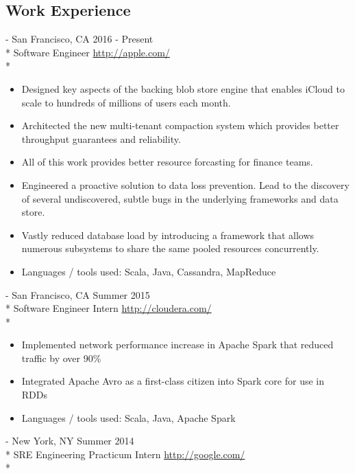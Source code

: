 \documentclass[a4paper,margin,line]{resume}
\newcommand{\rurl}[1]{\hfill {\footnotesize \url{#1}}}
\newcommand{\rdate}[1]{\hfill {\small #1}}
\renewcommand{\employer}[5]{ \item[#1] - #2 \rdate{#3} \\* #4 \rurl{#5} \\*}
\begin{document}
\begin{resume}
  \section{\mysidestyle Work Experience}
  \begin{asparadesc}
    \small \employer{Apple Inc. (iCloud)}{San Francisco, CA}{2016 - Present}{Software
      Engineer}{http://apple.com/}
    \vspace{-5mm}
    \begin{itemize}
      \item Designed key aspects of the backing blob store engine that enables iCloud to scale to
        hundreds of millions of users each month.
      \item Architected the new multi-tenant compaction system which provides better throughput
        guarantees and reliability.
      \item All of this work provides better resource forcasting for finance teams. 
      \item Engineered a proactive solution to data loss prevention. Lead to the discovery of
        several undiscovered, subtle bugs in the underlying frameworks and data store.
      \item Vastly reduced database load by introducing a framework that allows numerous subsystems
        to share the same pooled resources concurrently.
      \item Languages / tools used: Scala, Java, Cassandra, MapReduce
    \end{itemize}
    \employer{Cloudera}{San Francisco, CA}{Summer 2015}{Software Engineer
      Intern}{http://cloudera.com/}
    \vspace{-5mm}
    \begin{itemize}
    \item Implemented network performance increase in Apache Spark that reduced traffic by over
      90\%
    \item Integrated Apache Avro as a first-class citizen into Spark core for use in RDDs
    \item Languages / tools used: Scala, Java, Apache Spark
    \end{itemize}
    \employer{Google}{New York, NY}{Summer 2014}{SRE Engineering Practicum
      Intern}{http://google.com/}
    \vspace{-5mm}

\end{asparadesc}
\end{resume}
\end{document}
